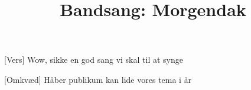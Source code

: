 \documentclass[a4paper,11pt]{article}
\title{Bandsang: Morgendak}
\begin{document}
\maketitle

\begin{song}
[Vers] Wow, sikke en god sang vi skal til at synge

[Omkvæd] Håber publikum kan lide vores tema i år
\end{song}
\end{document}
